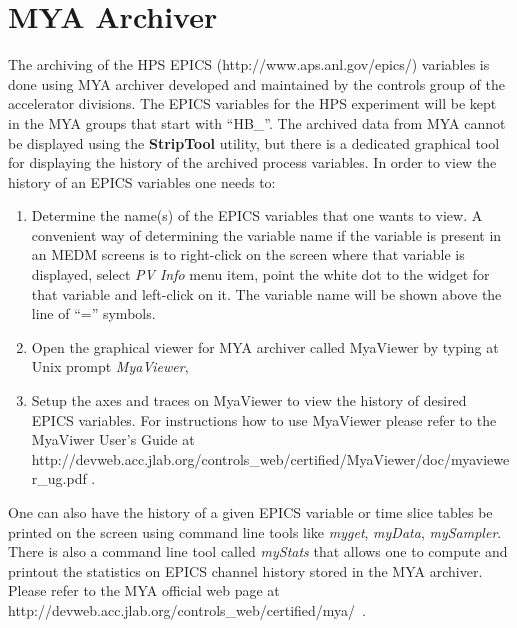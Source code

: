 \documentclass[letter,10pt]{article}
\begin{document}
\section{MYA Archiver}
The archiving of the HPS EPICS (http://www.aps.anl.gov/epics/) variables is done using MYA archiver
developed and maintained by the controls group of the accelerator divisions. The EPICS variables for 
the HPS experiment will be kept in the MYA groups that start with ``HB\_''. The archived data from MYA 
cannot be displayed using the \textbf{StripTool} utility, but there is a dedicated graphical tool for 
displaying the history of the archived process variables. 
In order to view the history of an EPICS variables one needs to:
\begin{enumerate}
 \item Determine the name(s) of the EPICS variables that one wants to view. A convenient way of determining the variable name 
       if the variable is present in an MEDM screens is to right-click on the screen where that variable is displayed, 
       select \textit{PV Info} menu item, point the white dot to the widget for that variable and left-click on it. 
       The variable name will be shown above the line of ``='' symbols. 
 \item Open the graphical viewer for MYA archiver called MyaViewer by typing at Unix prompt \textit{MyaViewer},
 \item Setup the axes and traces on MyaViewer to view the history of desired EPICS variables. For instructions 
       how to use MyaViewer please refer to the MyaViwer User's
       Guide at \newline http://devweb.acc.jlab.org/controls\_web/certified/MyaViewer/doc/myaviewer\_ug.pdf .
\end{enumerate}
One can also have the history of a given EPICS variable or time slice tables be printed on the screen using  
command line tools like \textit{myget}, \textit{myData}, \textit{mySampler}. There is also a command
line tool called \textit{myStats} that allows one to
compute and printout the statistics on EPICS channel history stored in the MYA archiver. Please refer to the 
MYA official web page at \newline http://devweb.acc.jlab.org/controls\_web/certified/mya/~. 
\end{document}
